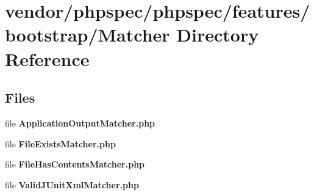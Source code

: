 \section{vendor/phpspec/phpspec/features/bootstrap/\+Matcher Directory Reference}
\label{dir_82ea2b3e997b00172fc950a1e8de3b4a}
\subsection*{Files}
\begin{DoxyCompactItemize}
\item 
file {\bf Application\+Output\+Matcher.\+php}
\item 
file {\bf File\+Exists\+Matcher.\+php}
\item 
file {\bf File\+Has\+Contents\+Matcher.\+php}
\item 
file {\bf Valid\+J\+Unit\+Xml\+Matcher.\+php}
\end{DoxyCompactItemize}
